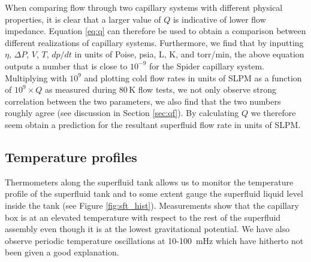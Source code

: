 \documentclass[
12pt, %
letterpaper, %
oneside, %
headinclude, footinclude, %
BCOR5mm, %
]{scrartcl}
\newcommand{\spider}{{\sc Spider} }
\begin{document}
When comparing flow through two capillary systems with different physical properties, it is clear that a larger value of $Q$ is indicative of lower flow impedance. Equation \ref{eq:q} can therefore be used to obtain a comparison between different realizations of capillary systems. Furthermore, we find that by inputting $\eta$, $\Delta P$, $V$, $T$, $dp/dt$ in units of Poise, psia, L, K, and torr/min, the above equation outputs a number that is close to $10^{-9}$ for the \spider capillary system. Multiplying with $10^9$ and plotting cold flow rates in units of SLPM as a function of $10^{9} \times Q$ as measured during 80\,K flow tests, we not only observe strong correlation between the two parameters, we also find that the two numbers roughly agree (see discussion in Section \ref{sec:qf}). By calculating $Q$ we therefore seem obtain a prediction for the resultant superfluid flow rate in units of SLPM. 

\subsection{Temperature profiles}


Thermometers along the superfluid tank allows us to monitor the temperature profile of the superfluid tank and to some extent gauge the superfluid liquid level inside the tank (see Figure \ref{fig:sft_hist}). Measurements show that the capillary box is at an elevated temperature with respect to the rest of the superfluid assembly even though it is at the lowest gravitational potential. We have also observe periodic temperature oscillations at 10-100~mHz which have hitherto not been given a good explanation.
\end{document}
